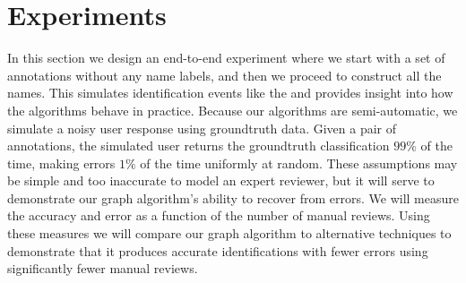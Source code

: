 

\begin{comment}
Another alternative might be measuring once the advantages from the ranking
algorithm become indistinguishable from a brute force search.


Let $D = \binom{|V|}{2}$ be the number of edges in the dataset and let $N=\sum_{C \in \set{C}} (|C| - 1)$ the
  number of edges in the MSTs of all PCCs.
We can measure the density of meaninful reviews in the current labeled dataset as $N/D$.

After our estimated mu gets close enough to to $N/D$, we can terminate.

\end{comment}

\poisson{}




\section{Experiments}\label{sec:graphexpt}

    In this section we design an end-to-end experiment where we start with a set of annotations without any name
      labels, and then we proceed to construct all the names.
    This simulates identification events like the \GZC{} and provides insight into how the algorithms behave in
      practice.
    Because our algorithms are semi-automatic, we simulate a noisy user response using groundtruth data.
    Given a pair of annotations, the simulated user returns the groundtruth classification $99\percent$ of the
      time, making errors $1\percent$ of the time uniformly at random.
    These assumptions may be simple and too inaccurate to model an expert reviewer, but it will serve to
      demonstrate our graph algorithm's ability to recover from errors.
    We will measure the accuracy and error as a function of the number of manual reviews.
    Using these measures we will compare our graph algorithm to alternative techniques to demonstrate that it
      produces accurate identifications with fewer errors using significantly fewer manual reviews.

